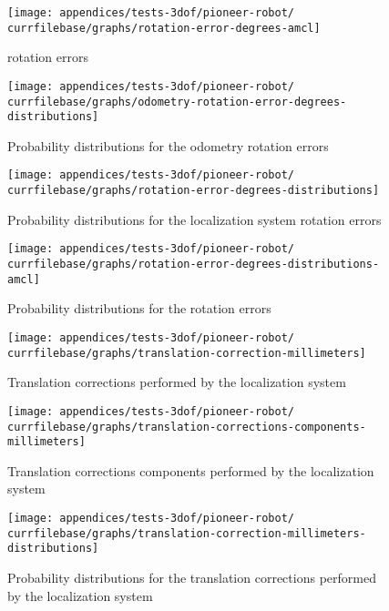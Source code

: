 \begin{figure}[H]
	\centering
	\texttt{[image: appendices/tests-3dof/pioneer-robot/\\currfilebase/graphs/rotation-error-degrees-amcl]}
	\caption{ rotation errors}
\end{figure}


\begin{figure}[H]
	\centering
	\texttt{[image: appendices/tests-3dof/pioneer-robot/\\currfilebase/graphs/odometry-rotation-error-degrees-distributions]}
	\caption{Probability distributions for the odometry rotation errors}
\end{figure}

\begin{figure}[H]
	\centering
	\texttt{[image: appendices/tests-3dof/pioneer-robot/\\currfilebase/graphs/rotation-error-degrees-distributions]}
	\caption{Probability distributions for the localization system rotation errors}
\end{figure}

\begin{figure}[H]
	\centering
	\texttt{[image: appendices/tests-3dof/pioneer-robot/\\currfilebase/graphs/rotation-error-degrees-distributions-amcl]}
	\caption{Probability distributions for the  rotation errors}
\end{figure}


\begin{figure}[H]
	\centering
	\texttt{[image: appendices/tests-3dof/pioneer-robot/\\currfilebase/graphs/translation-correction-millimeters]}
	\caption{Translation corrections performed by the localization system}
\end{figure}

\begin{figure}[H]
	\centering
	\texttt{[image: appendices/tests-3dof/pioneer-robot/\\currfilebase/graphs/translation-corrections-components-millimeters]}
	\caption{Translation corrections components performed by the localization system}
\end{figure}

\begin{figure}[H]
	\centering
	\texttt{[image: appendices/tests-3dof/pioneer-robot/\\currfilebase/graphs/translation-correction-millimeters-distributions]}
	\caption{Probability distributions for the translation corrections performed by the localization system}
\end{figure}


